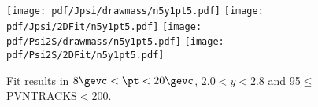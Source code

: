 \begin{figure}[H]
\begin{center}
\texttt{[image: pdf/Jpsi/drawmass/n5y1pt5.pdf]}
\texttt{[image: pdf/Jpsi/2DFit/n5y1pt5.pdf]}
\vspace*{-0.5cm}
\texttt{[image: pdf/Psi2S/drawmass/n5y1pt5.pdf]}
\texttt{[image: pdf/Psi2S/2DFit/n5y1pt5.pdf]}
\vspace*{-0.5cm}
\end{center}
\caption{Fit results in $8\gevc<\pt<20\gevc$, $2.0<y<2.8$ and 95$\leq$PVNTRACKS$<$200.}
\label{Fitn5y1pt5}
\end{figure}
